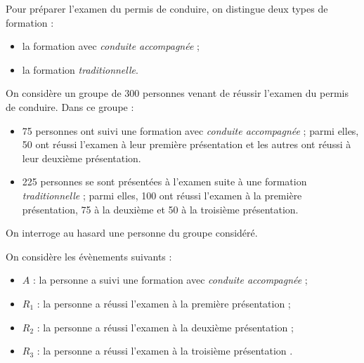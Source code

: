 
\medskip

Pour préparer l’examen du permis de conduire, on distingue deux types de formation :

\begin{itemize}
\item la formation avec \emph{conduite accompagnée} ;
\item la formation \emph{traditionnelle}.
\end{itemize}

On considère un groupe de 300 personnes venant de réussir l’examen du permis de conduire. Dans ce groupe :

\begin{itemize}
\item 75 personnes ont suivi une formation avec \emph{conduite accompagnée} ; parmi elles, 50 ont réussi l’examen à leur première présentation et les autres ont réussi à leur deuxième présentation.
\item  225 personnes se sont présentées à l’examen suite à une formation \emph{traditionnelle} ; parmi elles, 100 ont réussi l’examen à la première présentation, 75 à la deuxième et 50 à la troisième présentation.
\end{itemize}

On interroge au hasard une personne du groupe considéré.

On considère les évènements suivants :
\begin{itemize}
\item [] $A$ : \og la personne a suivi une formation avec \emph{conduite accompagnée} \fg{} ;
\item [] $R_1$ : \og la personne a réussi l’examen à la première présentation \fg{} ;
\item []$R_2$ : \og la personne a réussi l’examen à la deuxième présentation \fg{} ;
\item []$R_3$ : \og la personne a réussi l’examen à la troisième présentation \fg.
\end{itemize}

\medskip

